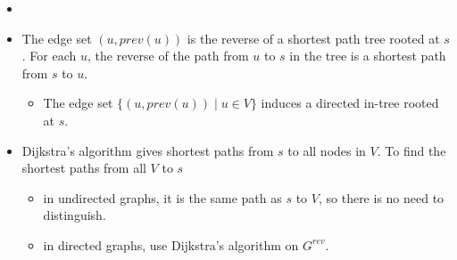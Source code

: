 \documentclass[12pt]{article}
\begin{document}
\begin{itemize}
    \item[] 
    \item The edge set $(u, prev(u))$ is the reverse of a shortest path tree rooted at $s$. For each $u$, the reverse of the path from $u$ to $s$ in the tree is a shortest path from $s$ to $u$.
    \begin{itemize}
        \item The edge set $\{ (u, prev(u)) \mid u \in V \}$ induces a directed in-tree rooted at $s$.
    \end{itemize}
    \item Dijkstra's algorithm gives shortest paths from $s$ to all nodes in $V$. To find the shortest paths from all $V$ to $s$
    \begin{itemize}
        \item in undirected graphs, it is the same path as $s$ to $V$, so there is no need to distinguish.
        \item in directed graphs, use Dijkstra's algorithm on $G^{rev}$.
    \end{itemize}
\end{itemize}
\end{document}
